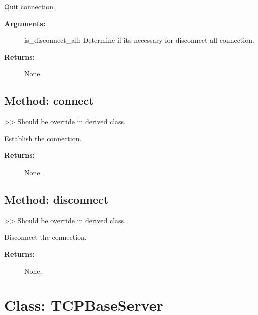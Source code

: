 Quit connection.

\begin{description}
\item[\textbf{Arguments:}]
is\_disconnect\_all: Determine if it\textquotesingle s necessary for
disconnect all connection.
\item[\textbf{Returns:}]
None.
\end{description}

\hypertarget{qconnectbase-tcp-tcp-base-method-connect-68}{%
\subsection{Method: connect}\label{qconnectbase-tcp-tcp-base-method-connect-68}}

\textgreater\textgreater{} Should be override in derived class.

Establish the connection.

\begin{description}
\item[\textbf{Returns:}]
None.
\end{description}

\hypertarget{qconnectbase-tcp-tcp-base-method-disconnect-69}{%
\subsection{Method: disconnect}\label{qconnectbase-tcp-tcp-base-method-disconnect-69}}

\textgreater\textgreater{} Should be override in derived class.

Disconnect the connection.

\begin{description}
\item[\textbf{Returns:}]
None.
\end{description}

\hypertarget{qconnectbase-tcp-tcp-base-class-tcpbaseserver-70}{%
\section{Class: TCPBaseServer}\label{qconnectbase-tcp-tcp-base-class-tcpbaseserver-70}}

\begin{Shaded}
\begin{Highlighting}[]
\end{Highlighting}
\end{Shaded}


